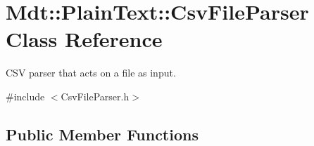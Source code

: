 \hypertarget{class_mdt_1_1_plain_text_1_1_csv_file_parser}{}\section{Mdt\+:\+:Plain\+Text\+:\+:Csv\+File\+Parser Class Reference}
\label{class_mdt_1_1_plain_text_1_1_csv_file_parser}


C\+SV parser that acts on a file as input.  




{\ttfamily \#include $<$Csv\+File\+Parser.\+h$>$}

\subsection*{Public Member Functions}
